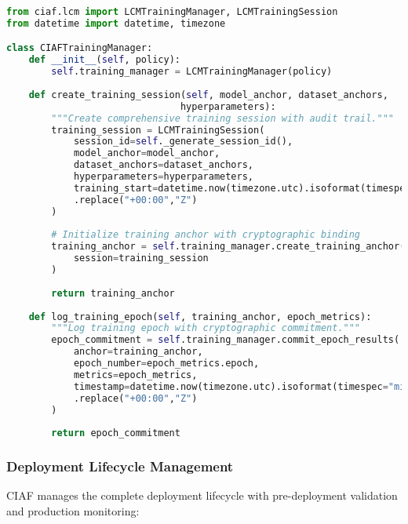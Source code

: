 \documentclass[12pt,a4paper]{article}
\begin{document}
\begin{lstlisting}[language=Python, caption=Training Manager Implementation]
from ciaf.lcm import LCMTrainingManager, LCMTrainingSession
from datetime import datetime, timezone

class CIAFTrainingManager:
    def __init__(self, policy):
        self.training_manager = LCMTrainingManager(policy)
        
    def create_training_session(self, model_anchor, dataset_anchors, 
                               hyperparameters):
        """Create comprehensive training session with audit trail."""
        training_session = LCMTrainingSession(
            session_id=self._generate_session_id(),
            model_anchor=model_anchor,
            dataset_anchors=dataset_anchors,
            hyperparameters=hyperparameters,
            training_start=datetime.now(timezone.utc).isoformat(timespec="microseconds")
            .replace("+00:00","Z")
        )
        
        # Initialize training anchor with cryptographic binding
        training_anchor = self.training_manager.create_training_anchor(
            session=training_session
        )
        
        return training_anchor
    
    def log_training_epoch(self, training_anchor, epoch_metrics):
        """Log training epoch with cryptographic commitment."""
        epoch_commitment = self.training_manager.commit_epoch_results(
            anchor=training_anchor,
            epoch_number=epoch_metrics.epoch,
            metrics=epoch_metrics,
            timestamp=datetime.now(timezone.utc).isoformat(timespec="microseconds")
            .replace("+00:00","Z")
        )
        
        return epoch_commitment
\end{lstlisting}

\subsubsection{Deployment Lifecycle Management}

CIAF manages the complete deployment lifecycle with pre-deployment validation and production monitoring:
\end{document}
